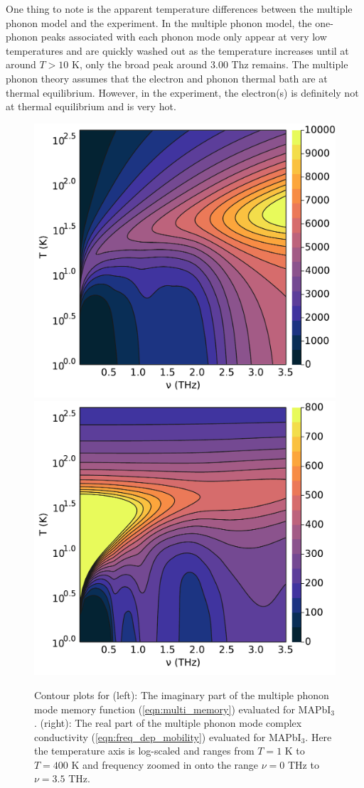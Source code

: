 One thing to note is the apparent temperature differences between the multiple phonon model and the experiment. In the multiple phonon model, the one-phonon peaks associated with each phonon mode only appear at very low temperatures and are quickly washed out as the temperature increases until at around $T > 10$ K, only the broad peak around $3.00$ Thz remains. The multiple phonon theory assumes that the electron and phonon thermal bath are at thermal equilibrium. However, in the experiment, the electron(s) is definitely not at thermal equilibrium and is very hot.

\begin{figure}[h]
    \centering
    \includegraphics[width=.49\textwidth]{figures/multi_contour_real_chi.pdf}
    \includegraphics[width=.49\textwidth]{figures/multi_contour_real_0.pdf}
    
    \caption{Contour plots for (left): The imaginary part of the multiple phonon mode memory function (\ref{eqn:multi_memory}) evaluated for MAPbI$_3$. (right): The real part of the multiple phonon mode complex conductivity (\ref{eqn:freq_dep_mobility}) evaluated for MAPbI$_3$. Here the temperature axis is log-scaled and ranges from $T = 1$ K to $T = 400$ K and frequency zoomed in onto the range $\nu = 0$ THz to $\nu = 3.5$ THz.}
    \label{fig:thermal_thz}
\end{figure}

